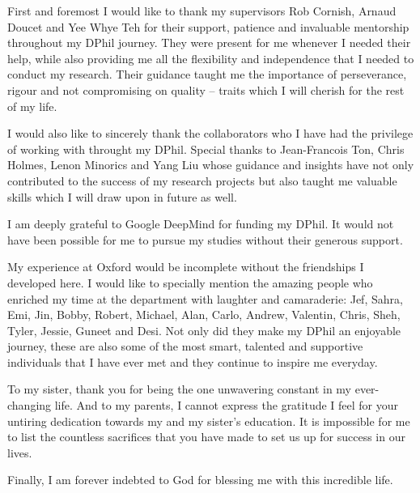 First and foremost I would like to thank my supervisors Rob Cornish, Arnaud Doucet and Yee Whye Teh 
for their support, patience and invaluable mentorship throughout my DPhil journey. 
They were present for me whenever I needed their help, while also providing me all the flexibility and independence that I needed to conduct my research. 
Their guidance taught me the importance of perseverance, rigour and not compromising on quality -- 
traits which I will cherish for the rest of my life.

I would also like to sincerely thank the collaborators who I have had the privilege of working with throught my DPhil. 
Special thanks to Jean-Francois Ton, Chris Holmes, Lenon Minorics and Yang Liu whose guidance and insights have not only contributed to the success of my research projects but also taught me valuable skills which I will draw upon in future as well.

I am deeply grateful to Google DeepMind for funding my DPhil. 
It would not have been possible for me to pursue my studies without their generous support.

My experience at Oxford would be incomplete without the friendships I developed here. 
I would like to specially mention the amazing people who enriched my time at the department with laughter and camaraderie: 
Jef, Sahra, Emi, Jin, Bobby, Robert, Michael, Alan, Carlo, Andrew, Valentin, Chris, Sheh, Tyler, Jessie, Guneet and Desi.  
Not only did they make my DPhil an enjoyable journey, these are also some of the most smart, talented and supportive individuals that I have ever met and they continue to inspire me everyday. 

To my sister, thank you for being the one unwavering constant in my ever-changing life. 
And to my parents, I cannot express the gratitude I feel for your untiring dedication towards my and my sister's education.
It is impossible for me to list the countless sacrifices that you have made to set us up for success in our lives. 

Finally, I am forever indebted to God for blessing me with this incredible life.